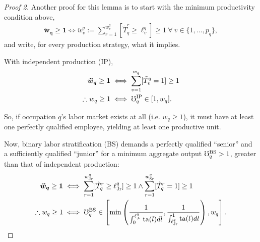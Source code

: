 \documentclass[hidelinks, nonatbib]{elsarticle}
\begin{document}
\begin{lemma}
    \begin{proof}[Proof 2]
        Another proof for this lemma is to start with the minimum productivity condition above,
        \begin{gather}
            \boldsymbol{\ddot{w}_q}
            \geq
            \boldsymbol{1}
            \iff
            \ddot{w}_{v}^{q}
            :=
            \sum_{r=1}^{w_{v}^{q}}
            [\tilde{T}_{q}^{r} \geq \ell_{v}^{q}]
            \geq
            1
            \
            \forall
            \
            v \in \{1, \dots, p_q\}
            ,
        \end{gather}
        and write, for every production strategy, what it implies. 

        With independent production (IP),
        \begin{align}
            \boldsymbol{\ddot{w}_q}
            \geq
            \boldsymbol{1}
            &\iff
            \sum_{v=1}^{w_{q}}
            [\tilde{T}_{v}^{q} = 1]
            \geq
            1
            \\
            \therefore
            w_q \geq 1
            &\iff
            \mho_{q}^{\text{IP}}
            \in [1, w_q]
            .
        \end{align}

        So, if occupation $q$'s labor market exists at all (i.e. $w_q \geq 1$), it must have at least one perfectly qualified employee, yielding at least one productive unit.

        Now, binary labor stratification (BS) demands a perfectly qualified ``senior'' and a sufficiently qualified ``junior'' for a minimum aggregate output $\mho_{q}^{\text{BS}} > 1$, greater than that of independent production:
        \begin{align}
            \boldsymbol{\ddot{w}_q}
            \geq
            \boldsymbol{1}
            &\iff
            \sum_{r=1}^{w_{\text{Jr}}^{q}}
            [\tilde{T}_{q}^{r} \geq \ell_{\text{Jr}}^{q}]
            \geq
            1
            \land
            \sum_{r=1}^{w_{\text{Sr}}^{q}}
            [\tilde{T}_{q}^{r} = 1]
            \geq
            1
            \\
            \therefore
            w_q \geq 1
            &\iff
            \mho_{q}^{\text{BS}}
            \in
            \left[
                \min\left(
                    \frac{
                        1
                    }{
                        \int_{0}^{\ell_{\text{Jr}}^{q}}
                        \text{ta}(l)dl
                    }
                    ,
                    \frac{
                        1
                    }{
                        \int_{\ell_{\text{Jr}}^{q}}^{1}
                        \text{ta}(l)dl
                    }
                \right)
                ,
                w_q
            \right]
            .
        \end{align}


\end{proof}
\end{lemma}
\end{document}
